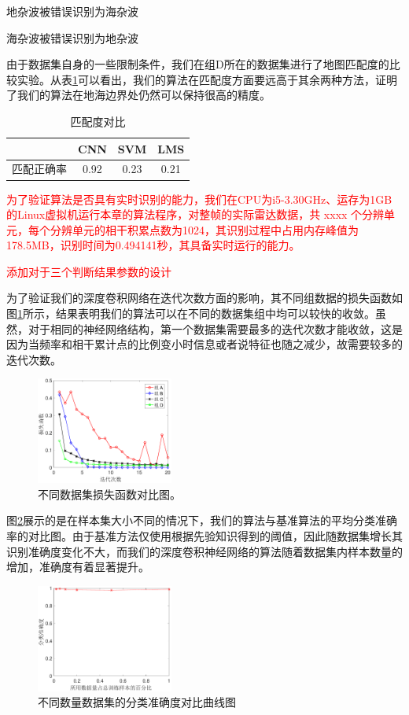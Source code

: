 地杂波被错误识别为海杂波

海杂波被错误识别为地杂波

由于数据集自身的一些限制条件，我们在组D所在的数据集进行了地图匹配度的比较实验。从表\ref{tab:method_pair}可以看出，我们的算法在匹配度方面要远高于其余两种方法，证明了我们的算法在地海边界处仍然可以保持很高的精度。
\begin{table}[H]
	\renewcommand{\arraystretch}{1.3}
	\caption{匹配度对比}
	\label{tab:method_pair}
	\centering
	\begin{tabular}{c|ccc}
		\hline
		& CNN & SVM & LMS \\
		\hline
		匹配正确率 & 0.92 & 0.23 & 0.21 \\
		\hline
	\end{tabular}
\end{table}

\textcolor{red}{
为了验证算法是否具有实时识别的能力，我们在CPU为i5-3.30GHz、运存为1GB的Linux虚拟机运行本章的算法程序，对整帧的实际雷达数据，共 xxxx 个分辨单元，每个分辨单元的相干积累点数为1024，其识别过程中占用内存峰值为178.5MB，识别时间为0.494141秒，其具备实时运行的能力。
}

\textcolor{red}{添加对于三个判断结果参数的设计}

为了验证我们的深度卷积网络在迭代次数方面的影响，其不同组数据的损失函数如图\ref{fig:group_results}所示，结果表明我们的算法可以在不同的数据集组中均可以较快的收敛。虽然，对于相同的神经网络结构，第一个数据集需要最多的迭代次数才能收敛，这是因为当频率和相干累计点的比例变小时信息或者说特征也随之减少，故需要较多的迭代次数。
\begin{figure}[H]
	\centering
	\includegraphics[width=0.4\textwidth]{figures/othr/group_results}
	\caption{不同数据集损失函数对比图。}
	\label{fig:group_results}
\end{figure}

图\ref{fig:sizes}展示的是在样本集大小不同的情况下，我们的算法与基准算法的平均分类准确率的对比图。由于基准方法仅使用根据先验知识得到的阈值，因此随数据集增长其识别准确度变化不大，而我们的深度卷积神经网络的算法随着数据集内样本数量的增加，准确度有着显著提升。
\begin{figure}[H]
	\centering
	\includegraphics[width=0.4\textwidth]{figures/othr/sizes}
	\caption{不同数量数据集的分类准确度对比曲线图}
	\label{fig:sizes}
\end{figure}

